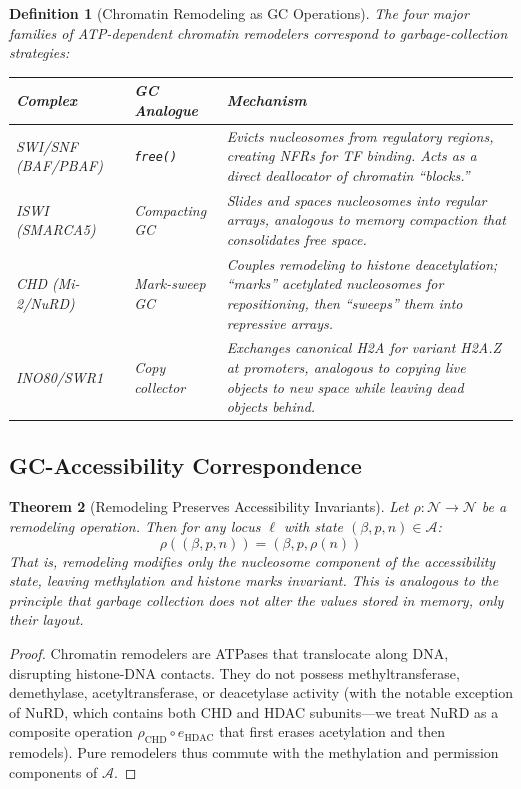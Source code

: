 \documentclass[12pt,a4paper]{article}
\newtheorem{theorem}{Theorem}[section]
\newtheorem{definition}[theorem]{Definition}
\begin{document}
\begin{definition}[Chromatin Remodeling as GC Operations]
\label{def:remodel-gc}
The four major families of ATP-dependent chromatin remodelers correspond to garbage-collection strategies:
\begin{center}
\begin{tabular}{llp{7cm}}
\toprule
\textbf{Complex} & \textbf{GC Analogue} & \textbf{Mechanism} \\
\midrule
SWI/SNF (BAF/PBAF) & \texttt{free()} & Evicts nucleosomes from regulatory regions, creating NFRs for TF binding. Acts as a direct deallocator of chromatin ``blocks.'' \\
ISWI (SMARCA5) & Compacting GC & Slides and spaces nucleosomes into regular arrays, analogous to memory compaction that consolidates free space. \\
CHD (Mi-2/NuRD) & Mark-sweep GC & Couples remodeling to histone deacetylation; ``marks'' acetylated nucleosomes for repositioning, then ``sweeps'' them into repressive arrays. \\
INO80/SWR1 & Copy collector & Exchanges canonical H2A for variant H2A.Z at promoters, analogous to copying live objects to new space while leaving dead objects behind. \\
\bottomrule
\end{tabular}
\end{center}
\end{definition}

\subsection{GC-Accessibility Correspondence}

\begin{theorem}[Remodeling Preserves Accessibility Invariants]
\label{thm:remodel-invariant}
Let $\rho : \mathcal{N} \to \mathcal{N}$ be a remodeling operation. Then for any locus $\ell$ with state $(\beta, p, n) \in \mathcal{A}$:
\[
    \rho((\beta, p, n)) = (\beta, p, \rho(n))
\]
That is, remodeling modifies only the nucleosome component of the accessibility state, leaving methylation and histone marks invariant. This is analogous to the principle that garbage collection does not alter the \emph{values} stored in memory, only their \emph{layout}.
\end{theorem}

\begin{proof}
Chromatin remodelers are ATPases that translocate along DNA, disrupting histone-DNA contacts. They do not possess methyltransferase, demethylase, acetyltransferase, or deacetylase activity (with the notable exception of NuRD, which contains both CHD and HDAC subunits---we treat NuRD as a composite operation $\rho_{\mathrm{CHD}} \circ e_{\mathrm{HDAC}}$ that first erases acetylation and then remodels). Pure remodelers thus commute with the methylation and permission components of $\mathcal{A}$.
\end{proof}
\end{document}
